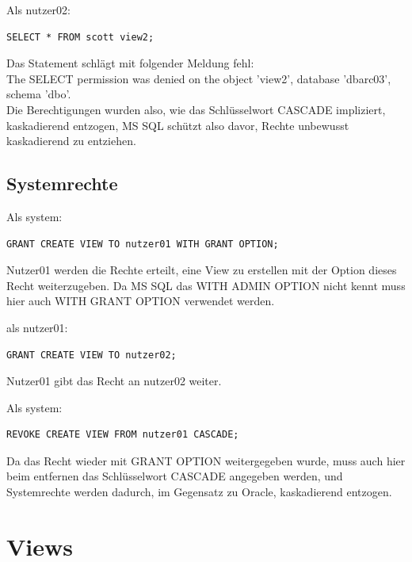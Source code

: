 \documentclass[10pt]{scrreprt}
\begin{document}
Als nutzer02:
\begin{lstlisting}[style=sql]
SELECT * FROM scott view2;
\end{lstlisting}
Das Statement schlägt mit folgender Meldung fehl:\\
The SELECT permission was denied on the object 'view2', database 'dbarc03', schema 'dbo'.\\
Die Berechtigungen wurden also, wie das Schlüsselwort CASCADE impliziert, kaskadierend entzogen, MS SQL schützt also davor, Rechte unbewusst kaskadierend zu entziehen.

\subsection{Systemrechte}
Als system:
\begin{lstlisting}[style=sql]
GRANT CREATE VIEW TO nutzer01 WITH GRANT OPTION;
\end{lstlisting}
Nutzer01 werden die Rechte erteilt, eine View zu erstellen mit der Option dieses Recht weiterzugeben. Da MS SQL das WITH ADMIN OPTION nicht kennt muss hier auch WITH GRANT OPTION verwendet werden.

als nutzer01:
\begin{lstlisting}[style=sql]
GRANT CREATE VIEW TO nutzer02;
\end{lstlisting}
Nutzer01 gibt das Recht an nutzer02 weiter.

Als system:
\begin{lstlisting}[style=sql]
REVOKE CREATE VIEW FROM nutzer01 CASCADE;
\end{lstlisting}
Da das Recht wieder mit GRANT OPTION weitergegeben wurde, muss auch hier beim entfernen das Schlüsselwort CASCADE angegeben werden, und Systemrechte werden dadurch, im Gegensatz zu Oracle, kaskadierend entzogen.

\section{Views}
\end{document}
